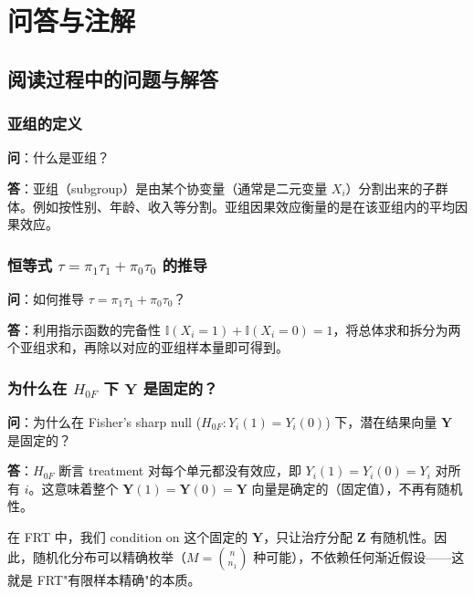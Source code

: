 
\appendix
\chapter{问答与注解}

\section{阅读过程中的问题与解答}


\subsection{亚组的定义}\label{sec:qa-subgroup}

\textbf{问}：什么是亚组？

\textbf{答}：亚组（subgroup）是由某个协变量（通常是二元变量 $X_i$）分割出来的子群体。例如按性别、年龄、收入等分割。亚组因果效应衡量的是在该亚组内的平均因果效应。

\subsection{恒等式 $\tau = \pi_1 \tau_1 + \pi_0 \tau_0$ 的推导}\label{sec:qa-tau-decomposition}

\textbf{问}：如何推导 $\tau = \pi_1 \tau_1 + \pi_0 \tau_0$？

\textbf{答}：利用指示函数的完备性 $\mathbb{I}(X_i=1) + \mathbb{I}(X_i=0) = 1$，将总体求和拆分为两个亚组求和，再除以对应的亚组样本量即可得到。

\subsection{为什么在 $H_{0F}$ 下 $\mathbf{Y}$ 是固定的？}\label{sec:qa-Y-fixed-under-H0F}

\textbf{问}：为什么在 Fisher's sharp null ($H_{0F}: Y_i(1) = Y_i(0)$) 下，潜在结果向量 $\mathbf{Y}$ 是固定的？

\textbf{答}：$H_{0F}$ 断言 treatment 对每个单元都没有效应，即 $Y_i(1) = Y_i(0) = Y_i$ 对所有 $i$。这意味着整个 $\mathbf{Y}(1) = \mathbf{Y}(0) = \mathbf{Y}$ 向量是确定的（固定值），不再有随机性。

在 FRT 中，我们 condition on 这个固定的 $\mathbf{Y}$，只让治疗分配 $\mathbf{Z}$ 有随机性。因此，随机化分布可以精确枚举（$M = \binom{n}{n_1}$ 种可能），不依赖任何渐近假设——这就是 FRT"有限样本精确"的本质。

